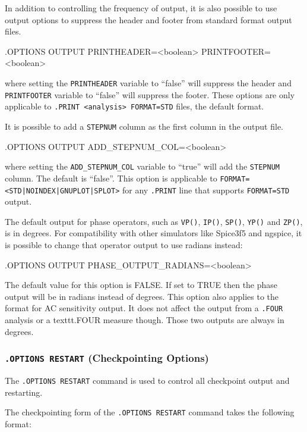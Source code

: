 In addition to controlling the frequency of output, it is also possible to use
output options to suppress the header and footer from standard format output files.
\begin{vquote}
.OPTIONS OUTPUT PRINTHEADER=<boolean> PRINTFOOTER=<boolean>
\end{vquote}
where setting the \texttt{PRINTHEADER} variable to ``false'' will suppress the header and 
\texttt{PRINTFOOTER} variable to ``false'' will suppress the footer.  These options are
only applicable to \texttt{.PRINT <analysis> FORMAT=STD} files, the default format.

It is possible to add a \texttt{STEPNUM} column as the first column in the output file.
\begin{vquote}
.OPTIONS OUTPUT ADD\_STEPNUM\_COL=<boolean>
\end{vquote}
where setting the \texttt{ADD\_STEPNUM\_COL} variable to ``true'' will add the
\texttt{STEPNUM} column.  The default is ``false''. This option is applicable to
\texttt{FORMAT=<STD|NOINDEX|GNUPLOT|SPLOT>} for any \texttt{.PRINT} line that
supports \texttt{FORMAT=STD} output.

The default \Xyce{} output for phase operators, such as \texttt{VP()}, \texttt{IP()},
\texttt{SP()}, \texttt{YP()} and \texttt{ZP()}, is in degrees.  For compatibility with
other simulators like Spice3f5 and ngspice, it is possible to change that operator
output to use radians instead:
\begin{vquote}
.OPTIONS OUTPUT PHASE\_OUTPUT\_RADIANS=<boolean>
\end{vquote}
The default value for this option is FALSE.  If set to TRUE then the phase output
will be in radians instead of degrees.  This option also applies to the format
for AC sensitivity output.  It does not affect the output from a \texttt{.FOUR}
analysis or a texttt{.FOUR} measure though.  Those two outputs are always in degrees.

\subsubsection{\texttt{.OPTIONS RESTART} (Checkpointing Options)}

The   \verb+.OPTIONS RESTART+ command is
used to control all  checkpoint output and restarting.

The checkpointing form of the \texttt{.OPTIONS RESTART} command takes the following format:

